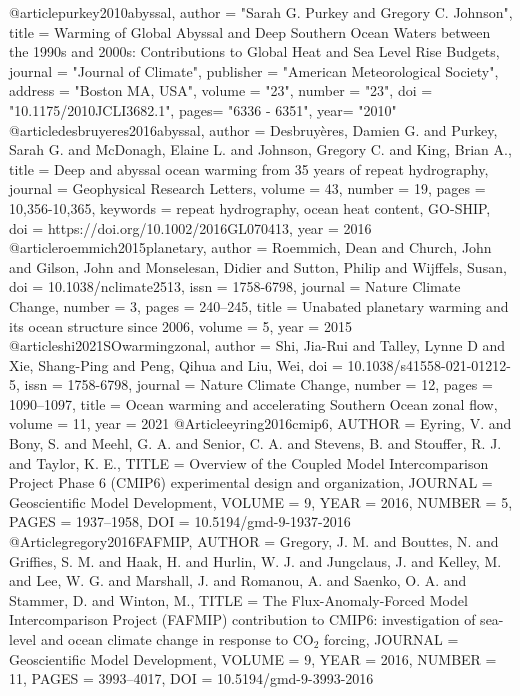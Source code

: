 @article{purkey2010abyssal,
 author = "Sarah G. Purkey and Gregory C. Johnson",
 title = {{Warming of Global Abyssal and Deep Southern Ocean Waters between the 1990s and 2000s: Contributions to Global Heat and Sea Level Rise Budgets}},
 journal = "Journal of Climate",
 publisher = "American Meteorological Society",
 address = "Boston MA, USA",
 volume = "23",
 number = "23",
 doi = "10.1175/2010JCLI3682.1",
 pages=      "6336 - 6351",
 year= "2010"
}
@article{desbruyeres2016abyssal,
 author = {Desbruyères, Damien G. and Purkey, Sarah G. and McDonagh, Elaine L. and Johnson, Gregory C. and King, Brian A.},
 title = {{Deep and abyssal ocean warming from 35 years of repeat hydrography}},
 journal = {Geophysical Research Letters},
 volume = {43},
 number = {19},
 pages = {10,356-10,365},
 keywords = {repeat hydrography, ocean heat content, GO-SHIP},
 doi = {https://doi.org/10.1002/2016GL070413},
 year = {2016}
}
@article{roemmich2015planetary,
 author = {Roemmich, Dean and Church, John and Gilson, John and Monselesan, Didier and Sutton, Philip and Wijffels, Susan},
 doi = {10.1038/nclimate2513},
 issn = {1758-6798},
 journal = {Nature Climate Change},
 number = {3},
 pages = {240--245},
 title = {{Unabated planetary warming and its ocean structure since 2006}},
 volume = {5},
 year = {2015}
}
@article{shi2021SOwarmingzonal,
author = {Shi, Jia-Rui and Talley, Lynne D and Xie, Shang-Ping and Peng, Qihua and Liu, Wei},
doi = {10.1038/s41558-021-01212-5},
issn = {1758-6798},
journal = {Nature Climate Change},
number = {12},
pages = {1090--1097},
title = {{Ocean warming and accelerating Southern Ocean zonal flow}},
volume = {11},
year = {2021}
}
@Article{eyring2016cmip6,
AUTHOR = {Eyring, V. and Bony, S. and Meehl, G. A. and Senior, C. A. and Stevens, B. and Stouffer, R. J. and Taylor, K. E.},
TITLE = {{Overview of the Coupled Model Intercomparison Project Phase 6 (CMIP6) experimental design and organization}},
JOURNAL = {Geoscientific Model Development},
VOLUME = {9},
YEAR = {2016},
NUMBER = {5},
PAGES = {1937--1958},
DOI = {10.5194/gmd-9-1937-2016}
}
@Article{gregory2016FAFMIP,
AUTHOR = {Gregory, J. M. and Bouttes, N. and Griffies, S. M. and Haak, H. and Hurlin, W. J. and Jungclaus, J. and Kelley, M. and Lee, W. G. and Marshall, J. and Romanou, A. and Saenko, O. A. and Stammer, D. and Winton, M.},
TITLE = {{The Flux-Anomaly-Forced Model Intercomparison Project (FAFMIP) contribution to CMIP6: investigation of sea-level and ocean climate change in response to CO$_{2}$ forcing}},
JOURNAL = {Geoscientific Model Development},
VOLUME = {9},
YEAR = {2016},
NUMBER = {11},
PAGES = {3993--4017},
DOI = {10.5194/gmd-9-3993-2016}
}
